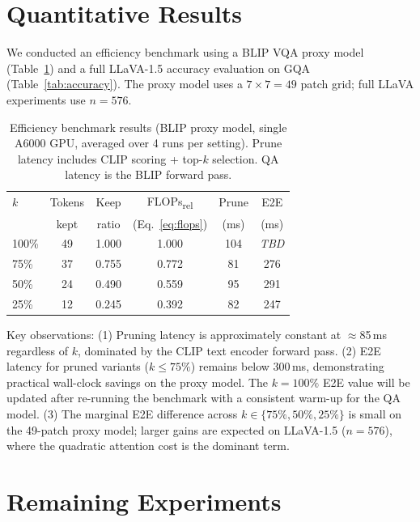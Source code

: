 \documentclass[10pt,twocolumn,letterpaper]{article}
\begin{document}
\section{Quantitative Results}

We conducted an efficiency benchmark using a BLIP VQA proxy model
(Table~\ref{tab:efficiency}) and a full LLaVA-1.5 accuracy evaluation
on GQA (Table~\ref{tab:accuracy}).
The proxy model uses a $7\!\times\!7 = 49$ patch grid;
full LLaVA experiments use $n=576$.

\begin{table}[htbp]
\centering
\small
\caption{Efficiency benchmark results (BLIP proxy model, single A6000 GPU,
         averaged over 4 runs per setting).
         Prune latency includes CLIP scoring + top-$k$ selection.
         QA latency is the BLIP forward pass.}
\label{tab:efficiency}
\begin{tabular}{@{}lccccc@{}}
\toprule
$k$ & Tokens & Keep & FLOPs\textsubscript{rel} & Prune & E2E \\
 & kept & ratio & (Eq.~\ref{eq:flops}) & (ms) & (ms) \\
\midrule
100\% & 49 & 1.000 & 1.000 & 104 & \textit{TBD} \\
75\%  & 37 & 0.755 & 0.772 &  81 &    276 \\
50\%  & 24 & 0.490 & 0.559 &  95 &    291 \\
25\%  & 12 & 0.245 & 0.392 &  82 &    247 \\
\bottomrule
\end{tabular}
\end{table}

Key observations:
(1) Pruning latency is approximately constant at $\approx$85\,ms regardless of $k$,
dominated by the CLIP text encoder forward pass.
(2) E2E latency for pruned variants ($k \leq 75\%$) remains below 300\,ms,
demonstrating practical wall-clock savings on the proxy model.
The $k\!=\!100\%$ E2E value will be updated after re-running the benchmark
with a consistent warm-up for the QA model.
(3) The marginal E2E difference across $k \in \{75\%, 50\%, 25\%\}$ is small
on the 49-patch proxy model; larger gains are expected on LLaVA-1.5 ($n=576$),
where the quadratic attention cost is the dominant term.

\section{Remaining Experiments}
\end{document}
